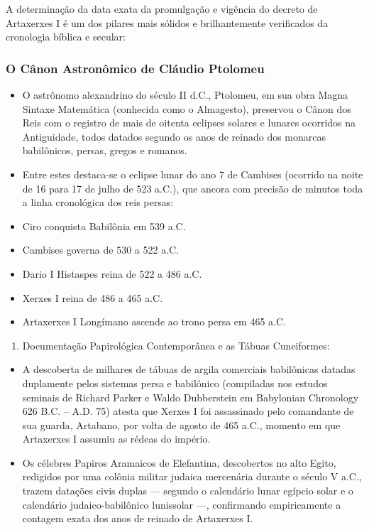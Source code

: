 \documentclass[11pt,a4paper,openany]{book}
\begin{document}
A determinação da data exata da promulgação e vigência do decreto de Artaxerxes I é um dos pilares mais sólidos e brilhantemente verificados da cronologia bíblica e secular:


\subsubsection*{O Cânon Astronômico de Cláudio Ptolomeu}
\begin{itemize}
  \item O astrônomo alexandrino do século II d.C., Ptolomeu, em sua obra Magna Sintaxe Matemática (conhecida como o Almagesto), preservou o Cânon dos Reis com o registro de mais de oitenta eclipses solares e lunares ocorridos na Antiguidade, todos datados segundo os anos de reinado dos monarcas babilônicos, persas, gregos e romanos.
  \item Entre estes destaca-se o eclipse lunar do ano 7 de Cambises (ocorrido na noite de 16 para 17 de julho de 523 a.C.), que ancora com precisão de minutos toda a linha cronológica dos reis persas:
  \item Ciro conquista Babilônia em 539 a.C.
  \item Cambises governa de 530 a 522 a.C.
  \item Dario I Histaspes reina de 522 a 486 a.C.
  \item Xerxes I reina de 486 a 465 a.C.
  \item Artaxerxes I Longímano ascende ao trono persa em 465 a.C.
\end{itemize}


\begin{enumerate}
  \item Documentação Papirológica Contemporânea e as Tábuas Cuneiformes:
\end{enumerate}

\begin{itemize}
  \item A descoberta de milhares de tábuas de argila comerciais babilônicas datadas duplamente pelos sistemas persa e babilônico (compiladas nos estudos seminais de Richard Parker e Waldo Dubberstein em Babylonian Chronology 626 B.C. – A.D. 75) atesta que Xerxes I foi assassinado pelo comandante de sua guarda, Artabano, por volta de agosto de 465 a.C., momento em que Artaxerxes I assumiu as rédeas do império.
  \item Os célebres Papiros Aramaicos de Elefantina, descobertos no alto Egito, redigidos por uma colônia militar judaica mercenária durante o século V a.C., trazem datações civis duplas — segundo o calendário lunar egípcio solar e o calendário judaico-babilônico lunissolar —, confirmando empiricamente a contagem exata dos anos de reinado de Artaxerxes I.
\end{itemize}
\end{document}
